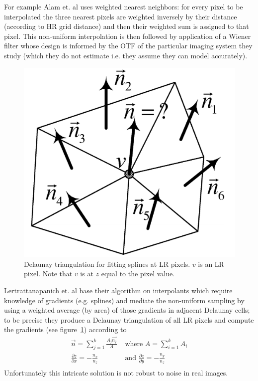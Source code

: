For example Alam et. al\cite{Alam2000} uses weighted nearest neighbors: for every pixel to be interpolated the three nearest pixels are weighted inversely by their distance (according to HR grid distance) and then their weighted sum is assigned to that pixel.
%
This non-uniform interpolation is then followed by application of a Wiener filter whose design is informed by the OTF of the particular imaging system they study (which they do not estimate i.e. they assume they can model accurately).
%
\begin{figure}
    \centering
    \includegraphics[width=.7\linewidth]{figures/delauney.png}
    \caption{Delaunay triangulation for fitting splines at LR pixels. $v$ is an LR pixel. Note that $v$ is at $z$ equal to the pixel value.}
    \label{fig:delauney}
\end{figure}
Lertrattanapanich et. al\cite{Lertrattanapanich} base their algorithm on interpolants which require knowledge of gradients (e.g. splines) and mediate the non-uniform sampling by using a weighted average (by area) of those gradients in adjacent Delaunay cells; to be precise they produce a Delaunay triangulation of all LR pixels and compute the gradients (see figure~\ref{fig:delauney}) according to
\begin{align*}
    \vec{n} = \sum_{j=1}^k \frac{A_j \vec{n_j}}{A} &\text{ where } A=\sum_{i=1}^k A_i\\
    \frac{\partial z}{\partial x} = -\frac{n_x}{n_z} &\text{ and }  \frac{\partial z}{\partial y} = -\frac{n_y}{n_z} \\
\end{align*}
Unfortunately this intricate solution is not robust to noise in real images.

